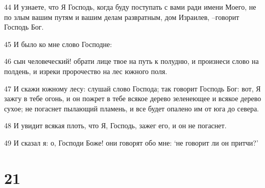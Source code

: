 \par 44 И узнаете, что Я Господь, когда буду поступать с вами ради имени Моего, не по злым вашим путям и вашим делам развратным, дом Израилев, --говорит Господь Бог.
\par 45 И было ко мне слово Господне:
\par 46 сын человеческий! обрати лице твое на путь к полудню, и произнеси слово на полдень, и изреки пророчество на лес южного поля.
\par 47 И скажи южному лесу: слушай слово Господа; так говорит Господь Бог: вот, Я зажгу в тебе огонь, и он пожрет в тебе всякое дерево зеленеющее и всякое дерево сухое; не погаснет пылающий пламень, и все будет опалено им от юга до севера.
\par 48 И увидит всякая плоть, что Я, Господь, зажег его, и он не погаснет.
\par 49 И сказал я: о, Господи Боже! они говорят обо мне: `не говорит ли он притчи?'

\chapter{21}

